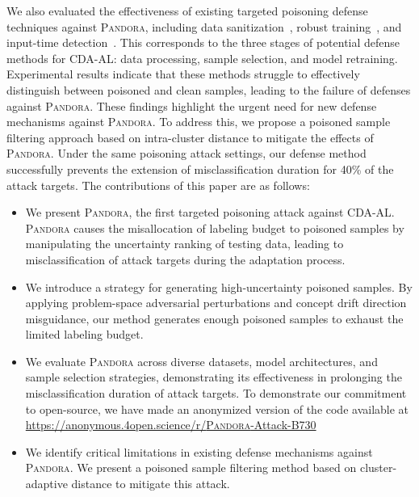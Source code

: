 \documentclass[lettersize,journal]{IEEEtran}
\newcommand{\pandora}{{\scshape Pandora}\xspace}
\begin{document}
We also evaluated the effectiveness of existing targeted poisoning defense techniques against \pandora, including data sanitization~\cite{chen2018detecting}, robust training~\cite{DFP}, and input-time detection~\cite{2023-ICCV-Trigger-Detect}.
This corresponds to the three stages of potential defense methods for CDA-AL: data processing, sample selection, and model retraining.
Experimental results indicate that these methods struggle to effectively distinguish between poisoned and clean samples, leading to the failure of defenses against \pandora.
These findings highlight the urgent need for new defense mechanisms against \pandora.
To address this, we propose a poisoned sample filtering approach based on intra-cluster distance to mitigate the effects of \pandora.
Under the same poisoning attack settings, our defense method successfully prevents the extension of misclassification duration for 40\% of the attack targets.
The contributions of this paper are as follows:
\begin{itemize}
	\item We present \pandora, the first targeted poisoning attack against CDA-AL.
	\pandora causes the misallocation of labeling budget to poisoned samples by manipulating the uncertainty ranking of testing data, leading to misclassification of attack targets during the adaptation process.
	
	\item We introduce a strategy for generating high-uncertainty poisoned samples.
	By applying problem-space adversarial perturbations and concept drift direction misguidance, our method generates enough poisoned samples to exhaust the limited labeling budget.
	
	\item We evaluate \pandora across diverse datasets, model architectures, and sample selection strategies, demonstrating its effectiveness in prolonging the misclassification duration of attack targets.
	To demonstrate our commitment to open-source, we have made an anonymized version of the code available at \href{https://anonymous.4open.science/r/\pandora-Attack-B730}{https://anonymous.4open.science/r/\pandora-Attack-B730} 
	
	\item We identify critical limitations in existing defense mechanisms against \pandora.
	We present a poisoned sample filtering method based on cluster-adaptive distance to mitigate this attack.
\end{itemize}

\end{document}
